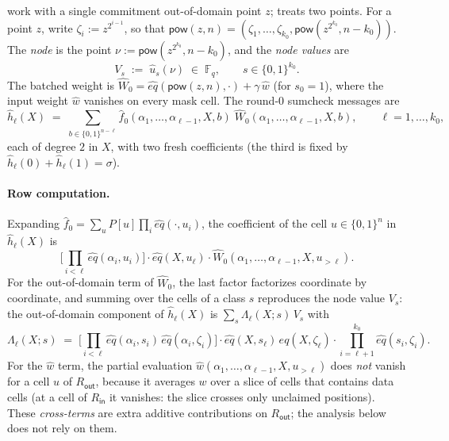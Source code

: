 \documentclass{article}
\newcommand{\Fq}{\mathbb{F}_q}
\newcommand{\pow}{\mathsf{pow}}
\theoremstyle{definition}
\begin{document}
 work with a single commitment out-of-domain point $z$;  treats two points. For a point $z$, write $\zeta_i := z^{2^{i-1}}$, so that $\pow(z, n) = (\zeta_1, \dots, \zeta_{k_0}, \pow(z^{2^{k_0}}, n - k_0))$. The \emph{node} is the point $\nu := \pow(z^{2^{k_0}}, n - k_0)$, and the \emph{node values} are
\[
V_s \;:=\; \hat{u}_s(\nu) \;\in\; \Fq , \qquad s \in \{0,1\}^{k_0} .
\]
The batched weight is $\hat{W}_0 = \hat{eq}(\pow(z, n), \cdot) + \gamma\, \hat{w}$ (for $s_0 = 1$), where the input weight $\hat{w}$ vanishes on every mask cell. The round-0 sumcheck messages are
\[
\hat{h}_\ell(X) \;=\; \sum_{b \in \{0,1\}^{n - \ell}} \hat{f}_0(\alpha_1, \dots, \alpha_{\ell - 1}, X, b)\; \hat{W}_0(\alpha_1, \dots, \alpha_{\ell - 1}, X, b) , \qquad \ell = 1, \dots, k_0 ,
\]
each of degree $2$ in $X$, with two fresh coefficients (the third is fixed by $\hat{h}_\ell(0) + \hat{h}_\ell(1) = \sigma$).

\paragraph{Row computation.} Expanding $\hat{f}_0 = \sum_u P[u] \prod_i \hat{eq}(\cdot, u_i)$, the coefficient of the cell $u \in \{0,1\}^n$ in $\hat{h}_\ell(X)$ is
\[
\Big[\prod_{i < \ell} \hat{eq}(\alpha_i, u_i)\Big] \cdot \hat{eq}(X, u_\ell) \cdot \hat{W}_0(\alpha_1, \dots, \alpha_{\ell-1}, X, u_{> \ell}) .
\]
For the out-of-domain term of $\hat{W}_0$, the last factor factorizes coordinate by coordinate, and summing over the cells of a class $s$ reproduces the node value $V_s$: the out-of-domain component of $\hat{h}_\ell(X)$ is $\sum_s \Lambda_\ell(X; s)\, V_s$ with
\begin{equation}\label{eq:lambda}
\Lambda_\ell(X; s) \;=\; \Big[\prod_{i < \ell} \hat{eq}(\alpha_i, s_i)\, \hat{eq}(\alpha_i, \zeta_i)\Big] \cdot \hat{eq}(X, s_\ell)\, \hat{eq}(X, \zeta_\ell) \cdot \prod_{i = \ell + 1}^{k_0} \hat{eq}(s_i, \zeta_i) .
\end{equation}
For the $\hat{w}$ term, the partial evaluation $\hat{w}(\alpha_1, \dots, \alpha_{\ell-1}, X, u_{>\ell})$ does \emph{not} vanish for a cell $u$ of $R_{\mathsf{out}}$, because it averages $w$ over a slice of cells that contains data cells (at a cell of $R_{\mathsf{in}}$ it vanishes: the slice crosses only unclaimed positions). These \emph{cross-terms} are extra additive contributions on $R_{\mathsf{out}}$; the analysis below does not rely on them.
\end{document}
